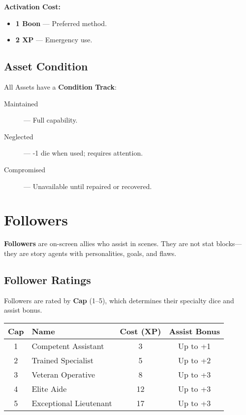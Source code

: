 \textbf{Activation Cost:}
\begin{itemize}
  \item \textbf{1 Boon} — Preferred method.
  \item \textbf{2 XP} — Emergency use.
\end{itemize}

\subsection*{Asset Condition}

All Assets have a \textbf{Condition Track}:

\begin{description}
  \item[Maintained] — Full capability.
  \item[Neglected] — -1 die when used; requires attention.
  \item[Compromised] — Unavailable until repaired or recovered.
\end{description}

\section{Followers}

\textbf{Followers} are on-screen allies who assist in scenes. They are not stat blocks—they are story agents with personalities, goals, and flaws.

\subsection*{Follower Ratings}

Followers are rated by \textbf{Cap} (1–5), which determines their specialty dice and assist bonus.

\begin{center}
\begin{tabular}{clcc}
\toprule
\textbf{Cap} & \textbf{Name} & \textbf{Cost (XP)} & \textbf{Assist Bonus} \\
\midrule
1 & Competent Assistant & 3 & Up to +1 \\
2 & Trained Specialist & 5 & Up to +2 \\
3 & Veteran Operative & 8 & Up to +3 \\
4 & Elite Aide & 12 & Up to +3 \\
5 & Exceptional Lieutenant & 17 & Up to +3 \\
\bottomrule
\end{tabular}
\end{center}

